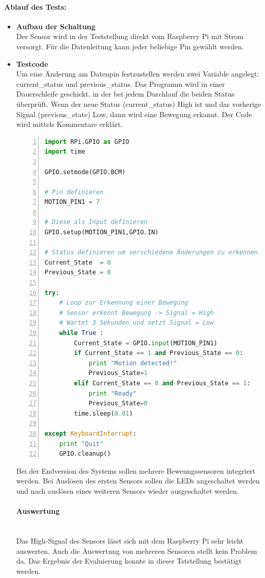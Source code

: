 \paragraph{Ablauf des Tests:}
\begin{itemize}
\item \textbf{Aufbau der Schaltung} \\
Der Sensor wird in der Teststellung direkt vom Raspberry Pi mit Strom versorgt. Für die Datenleitung kann jeder beliebige Pin gewählt werden. 
\item \textbf{Testcode} \\
Um eine Änderung am Datenpin festzustellen werden zwei Variable angelegt: current\_status und previous\_status. Das Programm wird in einer Dauerschleife geschickt, in der bei jedem Durchlauf die beiden Status überprüft. Wenn der neue Status (current\_status) High ist und das vorherige Signal (previous\_state) Low, dann wird eine Bewegung erkannt. Der Code wird mittels Kommentare erklärt.	

\begin{lstlisting}[caption = Testcode zur Bewegungserkennung mit Sensor, language=python, frame=single, breaklines=true,columns=fullflexible, commentstyle=\color{gray}\upshape, captionpos=b, numbers = left]
import RPi.GPIO as GPIO
import time

GPIO.setmode(GPIO.BCM)
	
# Pin definieren
MOTION_PIN1 = 7
	
# Diese als Input definieren
GPIO.setup(MOTION_PIN1,GPIO.IN)

# Status definieren um verschiedene Änderungen zu erkennen
Current_State  = 0
Previous_State = 0
					
try:
	# Loop zur Erkennung einer Bewegung
	# Sensor erkennt Bewegung -> Signal = High
	# Wartet 3 Sekunden und setzt Signal = Low
	while True :
		Current_State = GPIO.input(MOTION_PIN1)
		if Current_State == 1 and Previous_State == 0:
			print "Motion detected!"
			Previous_State=1
		elif Current_State == 0 and Previous_State == 1:
			print "Ready"
			Previous_State=0
		time.sleep(0.01)
	
except KeyboardInterrupt:
	print "Quit"
	GPIO.cleanup()
\end{lstlisting}
Bei der Endversion des Systems sollen mehrere Beweungssensoren integriert werden. Bei Auslösen des ersten Sensors sollen die LEDs angeschaltet werden und nach auslösen eines weiteren Sensors wieder ausgeschaltet werden. 
\paragraph{Auswertung}\\
Das High-Signal des Sensors lässt sich mit dem Raspberry Pi sehr leicht auswerten. Auch die Auswertung von mehreren Sensoren stellt kein Problem da. Das Ergebnis der Evaluierung konnte in dieser Tststellung bestätigt werden. 
\end{itemize}

